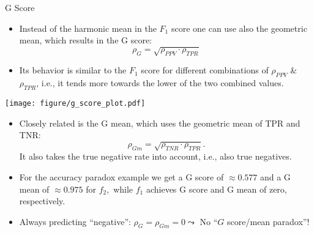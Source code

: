 \documentclass[11pt,compress,t,notes=noshow, xcolor=table]{beamer}
\begin{document}
\begin{vbframe}{G Score}
	\footnotesize
	
	\begin{minipage}[c]{0.5\textwidth}
	\footnotesize
	\begin{itemize}
		\item 	Instead of the harmonic mean in the $F_1$ score one can use also the geometric mean, which results in the G score: 
		$$\rho_{G} = \sqrt{\rho_{PPV} \cdot \rho_{TPR}}$$
		\item  Its behavior is similar to the $F_1$ score for different combinations of $\rho_{PPV}$ \& $\rho_{TPR}$, i.e., it tends more towards the lower of the two combined values.
	\end{itemize}
\end{minipage}%
\begin{minipage}[c]{0.5\textwidth}
	\centering
	\texttt{[image: figure/g\_score\_plot.pdf]}
\end{minipage}
%
\begin{itemize}
	\item %
	Closely related is the G mean, which uses the geometric mean of TPR and TNR:
	$$\rho_{Gm} = \sqrt{\rho_{TNR} \cdot \rho_{TPR}}.$$
	It also takes the true negative rate into account, i.e., also true negatives.
%	
	\item For the accuracy paradox example we get a G score of $\approx 0.577$ and a G mean of $\approx 0.975$ for $f_2,$ while $f_1$ achieves G score and G mean of zero, respectively.
%	
	\item Always predicting \enquote{negative}: $\rho_{G} = \rho_{Gm}  = 0 \leadsto$ No ``$G$ score/mean paradox''!
%
\end{itemize}
	
\end{vbframe}
\end{document}
